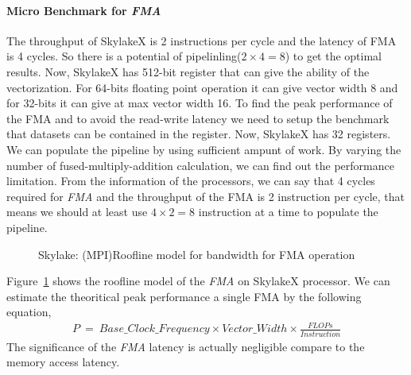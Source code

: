 \documentclass[sigconf,review,anonymous]{acmart}
\begin{document}
\paragraph{Micro Benchmark for \textit{FMA}}
The throughput of SkylakeX is 2 instructions per cycle and the latency of FMA is 4 cycles. So there is a potential 
of pipelinling($2\times 4 = 8$) to get the optimal results. Now, SkylakeX 
has 512-bit register that can give the ability of the vectorization. For 64-bits floating point operation it can give vector 
width 8 and for 32-bits it can give at max vector width 16. To find the peak performance of the FMA and to avoid the 
read-write latency we need to setup the benchmark that datasets can be contained in the register. Now, SkylakeX has 32 
registers. We can populate the pipeline by using sufficient ampunt of work. By varying the 
number of fused-multiply-addition calculation, we can find out the performance limitation. From the information of the 
processors, we can say that 4 cycles required for \textit{FMA} and the throughput of the FMA is 2 instruction per cycle, that means 
we should at least use $4\times 2=8$ instruction at a time to populate the pipeline.
\begin{figure}[hbt!]
	\centering
	\caption{Skylake: (MPI)Roofline model for bandwidth for FMA operation}
	\label{fig:mpi-skl-fma}
\end{figure}
Figure~\ref{fig:mpi-skl-fma} shows the roofline model of the \textit{FMA} on SkylakeX processor. 
We can estimate the theoritical peak performance a single FMA by the following equation,
\begin{eqnarray*}
P\ =\ Base\_Clock\_Frequency\times Vector\_Width\times \frac{FLOPs}{Instruction}
\end{eqnarray*}
The significance of the \textit{FMA} 
latency is actually negligible compare to the memory access latency. 
\end{document}
